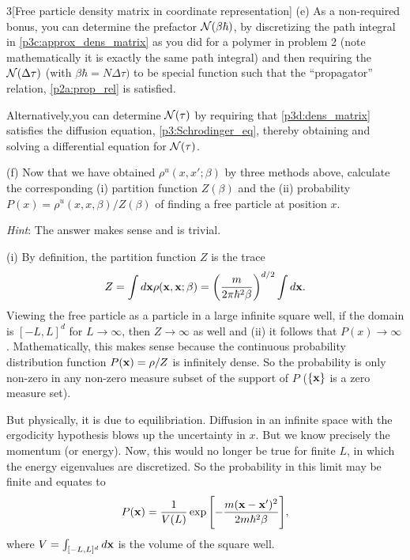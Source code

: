 \documentclass[12pt]{article}
\begin{document}
\begin{problem}{3}[Free particle density matrix in coordinate representation]
(e) As a non-required bonus, you can determine the prefactor $\mathcal{N}(\beta\hbar)$,
by discretizing the path integral in \eqref{p3c:approx_dens_matrix} as you did
for a polymer in problem 2 (note mathematically it is exactly the same path
integral) and then requiring the $\mathcal{N}(\Delta\tau)$ (with
$\beta\hbar=N\Delta\tau)$ to be special function such that the ``propagator''
relation, \eqref{p2a:prop_rel} is satisfied.

Alternatively,you can determine $\mathcal{N}(\tau)$ by requiring that
\eqref{p3d:dens_matrix} satisfies the diffusion equation,
\eqref{p3:Schrodinger_eq}, thereby obtaining and solving a differential equation
for $\mathcal{N}(\tau)$.
\begin{solution}
\end{solution}

(f) Now that we have obtained $\rho^u(x,x';\beta)$ by three methods above,
calculate the corresponding (i) partition function $Z(\beta)$ and the (ii)
probability $P(x)=\rho^u(x,x,\beta)/Z(\beta)$ of finding a free particle at
position $x$.

\textit{Hint}: The answer makes sense and is trivial.
\begin{solution}
(i) By definition, the partition function $Z$ is the trace
\begin{equation}
    Z=\int
    d\vb{x}\rho(\vb{x},\vb{x};\beta)=\qty(\frac{m}{2\pi\hbar^2\beta})^{d/2}\int
    d\vb{x}.
\end{equation}
Viewing the free particle as a particle in a large infinite square well, if the 
domain is $[-L,L]^d$ for $L\to\infty$, then $Z\to\infty$ as well and
(ii) it follows that $P(x)\to\infty$. Mathematically, this makes sense because
the continuous probability distribution function $P(\vb{x})=\rho/Z$ is 
infinitely dense. So the probability is only non-zero in any non-zero measure
subset of the support of $P$ ($\qty{\vb{x}}$ is a zero measure set).

But physically, it is due to equilibriation. Diffusion in an infinite space 
with the ergodicity hypothesis blows up the uncertainty in $x$. But we know 
precisely the momentum (or energy). Now, this would no longer be true for finite
$L$, in which the energy eigenvalues are discretized. So the probability in this
limit may be finite and equates to
\begin{equation}
    P(\vb{x})=\frac1{V(L)}\exp\qty[-\frac{m(\vb{x}-\vb{x}')^2}{2m\hbar^2\beta}],
\end{equation}
where $V=\int_{[-L,L]^d}d\vb{x}$ is the volume of the square well.
\end{solution}

\end{problem}
\end{document}
